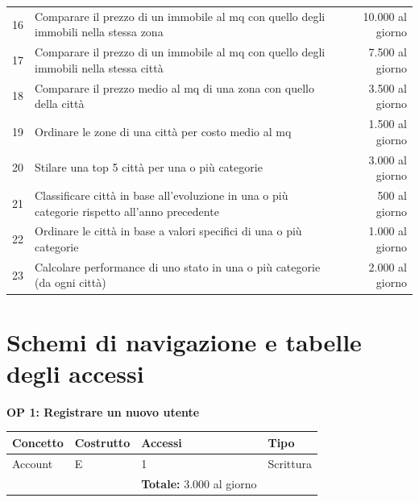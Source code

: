 \documentclass[a4paper,12pt]{report}
\begin{document}
\begin{table}
{\begin{tabular}{clr}
             16 & Comparare il prezzo di un immobile al mq con quello degli immobili nella stessa zona & 10.000 al giorno \\
             17 & Comparare il prezzo di un immobile al mq con quello degli immobili nella stessa città & 7.500 al giorno \\
             18 & Comparare il prezzo medio al mq di una zona con quello della città & 3.500 al giorno \\ 
             19 & Ordinare le zone di una città per costo medio al mq & 1.500 al giorno \\
             20 & Stilare una top 5 città per una o più categorie & 3.000 al giorno \\
             21 & Classificare città in base all'evoluzione in una o più categorie rispetto all'anno precedente & 500 al giorno \\ 
             22 & Ordinare le città in base a valori specifici di una o più categorie & 1.000 al giorno \\ 
             23 & Calcolare performance di uno stato in una o più categorie (da ogni città) & 2.000 al giorno \\ [1ex]
             \end{tabular}}
        \end{table}
        	
    	\section{Schemi di navigazione e tabelle degli accessi}
        	

        \textbf{OP 1: Registrare un nuovo utente}
        	\begin{table}[H]
            \centering
             \begin{tabular}{llll}
             \rowcolor{yellow!20}\textbf{Concetto} & \textbf{Costrutto} & \textbf{Accessi} & \textbf{Tipo} \\ [0.5ex] 
             \hline
             Account & E & 1 & Scrittura \\ 
             \hline
             \rowcolor{yellow!20}\rowcolor{yellow!20} &   & \textbf{Totale:}  3.000 al giorno &  \\ [1ex] 
             \end{tabular}
            \end{table}
\end{document}
